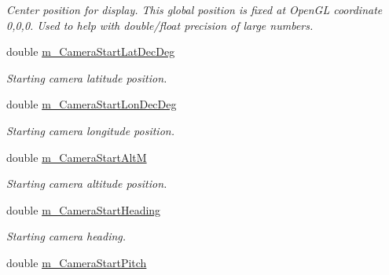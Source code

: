 \begin{DoxyCompactItemize}
\begin{DoxyCompactList}\small\item\em Center position for display. This global position is fixed at OpenGL coordinate 0,0,0. Used to help with double/float precision of large numbers. \end{DoxyCompactList}\item 
\hypertarget{class_viewer3_d_a5dbeb3d76603b3551ccc7e8bb838e70b}{
double \hyperlink{class_viewer3_d_a5dbeb3d76603b3551ccc7e8bb838e70b}{m\_\-CameraStartLatDecDeg}}
\label{class_viewer3_d_a5dbeb3d76603b3551ccc7e8bb838e70b}

\begin{DoxyCompactList}\small\item\em Starting camera latitude position. \end{DoxyCompactList}\item 
\hypertarget{class_viewer3_d_affbdf155e55e150553ec4f93c244814f}{
double \hyperlink{class_viewer3_d_affbdf155e55e150553ec4f93c244814f}{m\_\-CameraStartLonDecDeg}}
\label{class_viewer3_d_affbdf155e55e150553ec4f93c244814f}

\begin{DoxyCompactList}\small\item\em Starting camera longitude position. \end{DoxyCompactList}\item 
\hypertarget{class_viewer3_d_a0e753e3329fed84e0910657e8ab059a1}{
double \hyperlink{class_viewer3_d_a0e753e3329fed84e0910657e8ab059a1}{m\_\-CameraStartAltM}}
\label{class_viewer3_d_a0e753e3329fed84e0910657e8ab059a1}

\begin{DoxyCompactList}\small\item\em Starting camera altitude position. \end{DoxyCompactList}\item 
\hypertarget{class_viewer3_d_af13c90e0a080c55c7584cbb6a80001e8}{
double \hyperlink{class_viewer3_d_af13c90e0a080c55c7584cbb6a80001e8}{m\_\-CameraStartHeading}}
\label{class_viewer3_d_af13c90e0a080c55c7584cbb6a80001e8}

\begin{DoxyCompactList}\small\item\em Starting camera heading. \end{DoxyCompactList}\item 
\hypertarget{class_viewer3_d_ad55f04995ff09fa0e9da1e125c91471a}{
double \hyperlink{class_viewer3_d_ad55f04995ff09fa0e9da1e125c91471a}{m\_\-CameraStartPitch}}
\label{class_viewer3_d_ad55f04995ff09fa0e9da1e125c91471a}


\end{DoxyCompactItemize}
